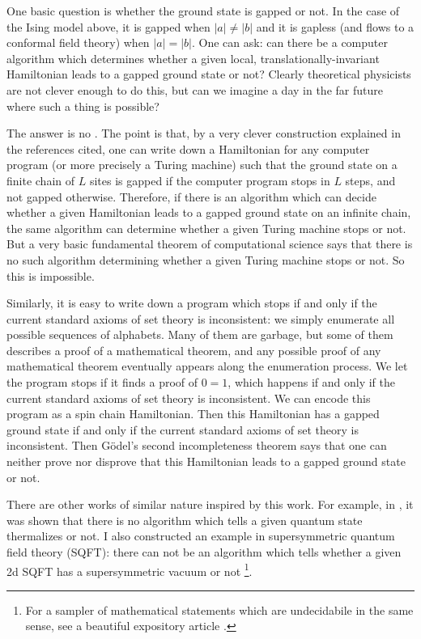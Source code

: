 \documentclass[12pt]{article}
\numberwithin{equation}{section}
\theoremstyle{remark}
\begin{document}
One basic question is whether the ground state is gapped or not. 
In the case of the Ising model above, it is gapped when $|a|\neq |b|$ and it is gapless (and flows to a conformal field theory) when $|a|=|b|$.
One can ask: can there be a computer algorithm
which determines whether a given local, translationally-invariant Hamiltonian leads to a gapped ground state or not?
Clearly theoretical physicists are not clever enough to do this,
but can we imagine a day in the far future where such a thing is possible?

The answer is no \cite{2dNature,2dLong,1d}.
The point is that, by a very clever construction explained in the references cited,
one can write down a Hamiltonian for any computer program (or more precisely a Turing machine)
such that the ground state on a finite chain of $L$ sites is gapped 
if the computer program stops in $L$ steps,
and not gapped otherwise.
Therefore, if there is an algorithm which can decide whether a given Hamiltonian leads to a gapped ground state on an infinite chain,
the same algorithm can determine whether a given Turing machine stops or not.
But a very basic fundamental theorem of computational science says that
there is no such algorithm determining whether a given Turing machine stops or not.
So this is impossible.

Similarly, it is easy to write down a program which stops if and only if the current standard axioms of set theory is inconsistent: 
we simply enumerate all possible sequences of alphabets.
Many of them are garbage, but some of them describes a proof of a mathematical theorem,
and any possible proof of any mathematical theorem eventually appears along the enumeration process.
We let the program stops if it finds a proof of $0=1$, which happens if and only if the current standard axioms of set theory is inconsistent. 
We can encode this program as a spin chain Hamiltonian.
Then this Hamiltonian has a gapped ground state if and only if the current standard axioms of set theory is inconsistent. 
Then G\"odel's second incompleteness theorem says that one can neither prove nor disprove that this Hamiltonian leads to a gapped ground state or not.

There are other works of similar nature inspired by this work.
For example, in \cite{thermalNature,thermalLong}, it was shown that 
there is no algorithm which tells a given quantum state thermalizes or not.
I also constructed an example in supersymmetric quantum field theory (SQFT):
there can not be an algorithm which tells whether a given 2d SQFT has a supersymmetric vacuum or not \cite{Tachikawa:2022vsh}\footnote{%
For a sampler of mathematical statements which are undecidabile in the same sense,
see a beautiful expository article \cite{Poonen}.
}.
\end{document}
